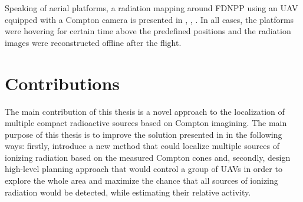 {Speaking of aerial platforms, a radiation mapping around \ac{FDNPP} using an \ac{UAV} equipped with a Compton camera is presented in \cite{Jiang2015}, \cite{Mochizuki_2017}, \cite{sato_drone_compton_camera_2018}.
In all cases, the platforms were hovering for certain time above the predefined positions and the radiation images were reconstructed offline after the flight.





















}%

\section{Contributions}
The main contribution of this thesis is a novel approach to the localization of multiple compact radioactive sources based on Compton imagining.
The main purpose of this thesis is to improve the solution presented in \cite{baca2021gamma} in the following ways: firstly, introduce a new method that could localize multiple sources of ionizing radiation based on the measured Compton cones and, 
secondly, 
design high-level planning approach that would control a group of \ac{UAV}s in order to explore the whole area and maximize the chance that all sources of ionizing radiation would be detected, while estimating their relative activity.


